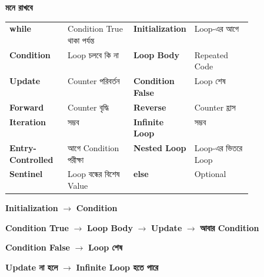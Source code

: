 \begin{rememberbox}

\textbf{\color{deepOrange}মনে রাখবে}

\begin{tabularx}
{\linewidth}
{
>{\bfseries\RaggedRight\arraybackslash}p{0.24\linewidth}
Y
>{\bfseries\RaggedRight\arraybackslash}p{0.24\linewidth}
Y
}

\textenglish{\ttfamily while}
&
Condition True থাকা পর্যন্ত
&
Initialization
&
Loop-এর আগে
\\[0.7mm]

Condition
&
Loop চলবে কি না
&
Loop Body
&
Repeated Code
\\[0.7mm]

Update
&
Counter পরিবর্তন
&
Condition False
&
Loop শেষ
\\[0.7mm]

Forward
&
Counter বৃদ্ধি
&
Reverse
&
Counter হ্রাস
\\[0.7mm]

0 Iteration
&
সম্ভব
&
Infinite Loop
&
সম্ভব
\\[0.7mm]

Entry-Controlled
&
আগে Condition পরীক্ষা
&
Nested Loop
&
Loop-এর ভিতরে Loop
\\[0.7mm]

Sentinel
&
Loop বন্ধের বিশেষ Value
&
\textenglish{\ttfamily else}
&
Optional
\\

\end{tabularx}

\medskip

\begin{center}

\textbf{Initialization}
\(\longrightarrow\)
\textbf{Condition}

\medskip

\textbf{Condition True}
\(\longrightarrow\)
\textbf{Loop Body}
\(\longrightarrow\)
\textbf{Update}
\(\longrightarrow\)
\textbf{আবার Condition}

\medskip

\textbf{Condition False}
\(\longrightarrow\)
\textbf{Loop শেষ}

\medskip

\textbf{Update না হলে}
\(\longrightarrow\)
\textbf{Infinite Loop হতে পারে}

\end{center}

\end{rememberbox}

\small


